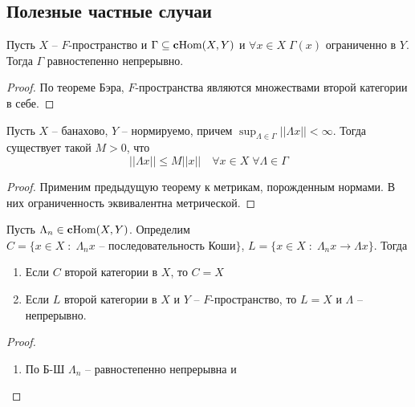 \documentclass[12pt, a4paper, oneside]{book}
\begin{document}
\subsection{Полезные частные случаи}
\begin{theorem}
    Пусть $X$ -- $F$-пространство и $\Gamma \subseteq \text{\textbf{c}Hom}(X,Y)$ и $\forall x \in X \; \Gamma(x)$ ограниченно в $Y$.
    Тогда $\Gamma$ равностепенно непрерывно.
\end{theorem}
\begin{proof}
По теореме Бэра, $F$-пространства являются множествами второй категории в себе.
\end{proof}
\begin{theorem}
    Пусть $X$ -- банахово, $Y$ -- нормируемо, причем $\sup_{\Lambda \in \Gamma} ||\Lambda x || < \infty$. Тогда существует такой $M > 0$, что
    $$||\Lambda x|| \leqslant M ||x||\quad \forall x \in X \; \forall \Lambda \in \Gamma$$
\end{theorem}
\begin{proof}
Применим предыдущую теорему к метрикам, порожденным нормами. В них ограниченность эквивалентна метрической.
\end{proof}
\begin{theorem}
    Пусть $\Lambda_n \in \text{\textbf{c}Hom}(X,Y)$. Определим $C = \{x \in X\; : \; \Lambda_n x \text{ -- последовательность Коши}   \}$, $L = \{x \in X \; : \; \Lambda_n x \to \Lambda x \}$.
    Тогда
    \begin{enumerate}
        \item Если $C$ второй категории в $X$, то $C = X$
        \item Если $L$ второй категории в $X$ и $Y$ -- $F$-пространство, то $L = X$ и $\Lambda$ -- непрерывно.
    \end{enumerate}
\end{theorem}
\begin{proof}
\begin{enumerate}
    \item По Б-Ш $\Lambda_n$ -- равностепенно непрерывна и
\end{enumerate}
\end{proof}
\end{document}
